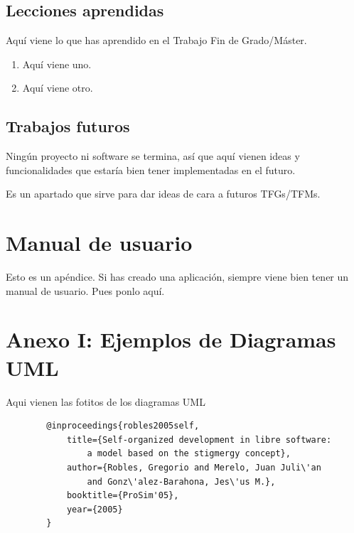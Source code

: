 \documentclass[a4paper, 12pt]{book}
\begin{document}
\section{Lecciones aprendidas}
\label{sec:lecciones_aprendidas}

Aquí viene lo que has aprendido en el Trabajo Fin de Grado/Máster.

\begin{enumerate}
  \item Aquí viene uno.
  \item Aquí viene otro.
\end{enumerate}


\section{Trabajos futuros}
\label{sec:trabajos_futuros}

Ningún proyecto ni software se termina, así que aquí vienen ideas y funcionalidades que estaría bien tener implementadas en el futuro.

Es un apartado que sirve para dar ideas de cara a futuros TFGs/TFMs.



\cleardoublepage
\appendix
\chapter{Manual de usuario}
\label{app:manual}

Esto es un apéndice.
Si has creado una aplicación, siempre viene bien tener un manual de usuario.
Pues ponlo aquí.

\chapter{Anexo I: Ejemplos de Diagramas UML}
Aqui vienen las fotitos de los diagramas UML 

{\footnotesize
	\begin{verbatim}
		@inproceedings{robles2005self,
			title={Self-organized development in libre software:
				a model based on the stigmergy concept},
			author={Robles, Gregorio and Merelo, Juan Juli\'an 
				and Gonz\'alez-Barahona, Jes\'us M.},
			booktitle={ProSim'05},
			year={2005}
		}
	\end{verbatim}
}
\end{document}
